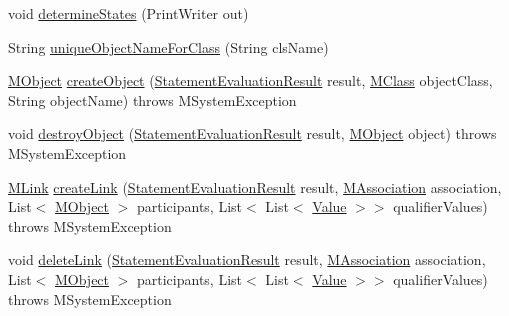 \begin{DoxyCompactItemize}
\item 
void \hyperlink{classorg_1_1tzi_1_1use_1_1uml_1_1sys_1_1_m_system_a39d2832f044e74b68cd29a3eabcaa637}{determine\-States} (Print\-Writer out)
\item 
String \hyperlink{classorg_1_1tzi_1_1use_1_1uml_1_1sys_1_1_m_system_a9e11a3a479db425cd54450348422c420}{unique\-Object\-Name\-For\-Class} (String cls\-Name)
\item 
\hyperlink{interfaceorg_1_1tzi_1_1use_1_1uml_1_1sys_1_1_m_object}{M\-Object} \hyperlink{classorg_1_1tzi_1_1use_1_1uml_1_1sys_1_1_m_system_a76db8dc16f4cb3909bc6422bd73fd9cf}{create\-Object} (\hyperlink{classorg_1_1tzi_1_1use_1_1uml_1_1sys_1_1_statement_evaluation_result}{Statement\-Evaluation\-Result} result, \hyperlink{interfaceorg_1_1tzi_1_1use_1_1uml_1_1mm_1_1_m_class}{M\-Class} object\-Class, String object\-Name)  throws M\-System\-Exception 
\item 
void \hyperlink{classorg_1_1tzi_1_1use_1_1uml_1_1sys_1_1_m_system_a29c9c66d1e600b4c93bd6e03428195da}{destroy\-Object} (\hyperlink{classorg_1_1tzi_1_1use_1_1uml_1_1sys_1_1_statement_evaluation_result}{Statement\-Evaluation\-Result} result, \hyperlink{interfaceorg_1_1tzi_1_1use_1_1uml_1_1sys_1_1_m_object}{M\-Object} object)  throws M\-System\-Exception 
\item 
\hyperlink{interfaceorg_1_1tzi_1_1use_1_1uml_1_1sys_1_1_m_link}{M\-Link} \hyperlink{classorg_1_1tzi_1_1use_1_1uml_1_1sys_1_1_m_system_a2259ce3d17b2a666bc9184de547b93c2}{create\-Link} (\hyperlink{classorg_1_1tzi_1_1use_1_1uml_1_1sys_1_1_statement_evaluation_result}{Statement\-Evaluation\-Result} result, \hyperlink{interfaceorg_1_1tzi_1_1use_1_1uml_1_1mm_1_1_m_association}{M\-Association} association, List$<$ \hyperlink{interfaceorg_1_1tzi_1_1use_1_1uml_1_1sys_1_1_m_object}{M\-Object} $>$ participants, List$<$ List$<$ \hyperlink{classorg_1_1tzi_1_1use_1_1uml_1_1ocl_1_1value_1_1_value}{Value} $>$$>$ qualifier\-Values)  throws M\-System\-Exception 
\item 
void \hyperlink{classorg_1_1tzi_1_1use_1_1uml_1_1sys_1_1_m_system_ace5b9e2e66dd68829aaad113e10fdd6c}{delete\-Link} (\hyperlink{classorg_1_1tzi_1_1use_1_1uml_1_1sys_1_1_statement_evaluation_result}{Statement\-Evaluation\-Result} result, \hyperlink{interfaceorg_1_1tzi_1_1use_1_1uml_1_1mm_1_1_m_association}{M\-Association} association, List$<$ \hyperlink{interfaceorg_1_1tzi_1_1use_1_1uml_1_1sys_1_1_m_object}{M\-Object} $>$ participants, List$<$ List$<$ \hyperlink{classorg_1_1tzi_1_1use_1_1uml_1_1ocl_1_1value_1_1_value}{Value} $>$$>$ qualifier\-Values)  throws M\-System\-Exception 

\end{DoxyCompactItemize}
